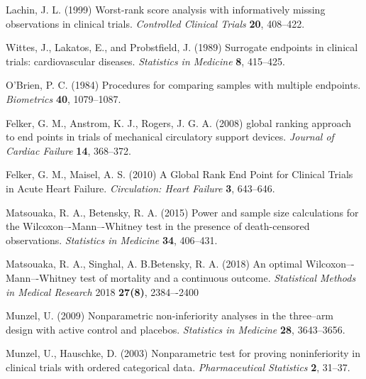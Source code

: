 \documentclass[bimj,fleqn]{w-art}\usepackage[]{graphicx}\usepackage[]{color}
\theoremstyle{plain}
\theoremstyle{definition}
\begin{document}
\begin{thebibliography}{10}

 Lachin, J. L. (1999) Worst-rank score
analysis with informatively missing observations in clinical trials.
\textit{Controlled Clinical Trials} \textbf{20}, 408--422.

Wittes, J., Lakatos, E., and Probstfield, J. (1989) Surrogate endpoints in
clinical trials: cardiovascular diseases. \textit{Statistics in Medicine}
\textbf{8}, 415--425.

 O'Brien, P. C. (1984) Procedures
for comparing samples with multiple endpoints. \textit{Biometrics}
\textbf{40}, 1079--1087.

Felker, G. M., Anstrom, K. J., Rogers, J. G. A. (2008) global ranking approach
to end points in trials of mechanical circulatory support devices.
\textit{Journal of Cardiac Failure} \textbf{14}, 368--372.

 Felker, G. M.,
Maisel, A. S. (2010) A Global Rank End Point for Clinical Trials in Acute Heart
Failure. \textit{Circulation: Heart Failure} \textbf{3}, 643--646.

Matsouaka, R. A., Betensky, R. A. (2015) Power and sample size calculations for
the Wilcoxon–-Mann–-Whitney test in the presence of death-censored observations.
\textit{Statistics in Medicine} \textbf{34}, 406--431.

Matsouaka, R. A., Singhal, A. B.Betensky, R. A. (2018) An optimal
Wilcoxon–-Mann–-Whitney test of mortality and a continuous outcome.
\textit{Statistical Methods in Medical Research} 2018 \textbf{27(8)}, 2384–-2400

Munzel, U. (2009) Nonparametric non‐inferiority analyses in the three--arm design
with active control and placebos.
\textit{Statistics in Medicine} \textbf{28}, 3643--3656.

Munzel, U., Hauschke, D. (2003) Nonparametric test for proving noninferiority in clinical trials with ordered categorical data.
\textit{Pharmaceutical Statistics} \textbf{2}, 31--37.


\end{thebibliography}
\end{document}
